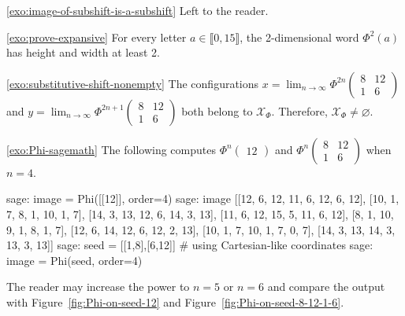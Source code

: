 \documentclass[12pt]{amsart}
\newcommand{\Xcal}{\mathcal{X}} %
\newcommand{\Zrange}[1]{\llbracket0,#1\rrbracket}
\begin{document}
\begin{exosolution}{\ref{exo:image-of-subshift-is-a-subshift}}
    Left to the reader.
\end{exosolution}

\begin{exosolution}{\ref{exo:prove-expansive}}
    For every letter $a\in\Zrange{15}$, the 2-dimensional
    word $\Phi^2(a)$ has height and width at least 2.
\end{exosolution}

\begin{exosolution}{\ref{exo:substitutive-shift-nonempty}}
The configurations
$x = \lim_{n\to\infty}\Phi^{2n}\left(\begin{smallmatrix}8&12\\1&6\end{smallmatrix}\right)$
    and
$y = \lim_{n\to\infty}\Phi^{2n+1}\left(\begin{smallmatrix}8&12\\1&6\end{smallmatrix}\right)$
both belong to $\Xcal_\Phi$. Therefore, $\Xcal_\Phi\neq\varnothing$.
\end{exosolution}

\begin{exosolution}{\ref{exo:Phi-sagemath}}
The following computes
$\Phi^{n}\left(\begin{smallmatrix}12\end{smallmatrix}\right)$
and
$\Phi^{n}\left(\begin{smallmatrix}8&12\\1&6\end{smallmatrix}\right)$
when $n=4$.
\begin{sagecommandlinetcb}
\begin{sagecommandline}
sage: image = Phi([[12]], order=4)
sage: image
[[12, 6, 12, 11, 6, 12, 6, 12],
[10, 1, 7, 8, 1, 10, 1, 7],
[14, 3, 13, 12, 6, 14, 3, 13],
[11, 6, 12, 15, 5, 11, 6, 12],
[8, 1, 10, 9, 1, 8, 1, 7],
[12, 6, 14, 12, 6, 12, 2, 13],
[10, 1, 7, 10, 1, 7, 0, 7],
[14, 3, 13, 14, 3, 13, 3, 13]]
sage: seed = [[1,8],[6,12]]  # using Cartesian-like coordinates
sage: image = Phi(seed, order=4)
\end{sagecommandline}
\end{sagecommandlinetcb}
The reader may increase the power to $n=5$ or $n=6$
and compare the output with Figure~\ref{fig:Phi-on-seed-12} and
Figure~\ref{fig:Phi-on-seed-8-12-1-6}.
\end{exosolution}
\end{document}
